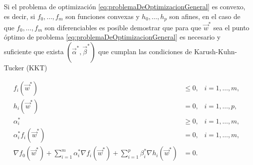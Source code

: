 \documentclass[letterpaper,12pt]{book}
\begin{document}
Si el problema de optimización \ref{eq:problemaDeOptimizacionGeneral} es convexo, es decir, si $f_0,\dots, f_m$ son funciones convexas y $h_0,\dots,h_p$ son afines, en el caso de que $f_0,\dots, f_m$ son diferenciables es posible demostrar que para que $\vec{w}^*$ sea el punto óptimo de problema \ref{eq:problemaDeOptimizacionGeneral} es necesario y suficiente que exista $(\vec{\alpha}^*,\vec{\beta}^*)$ que cumplan las condiciones de Karush-Kuhn-Tucker (KKT)

\begin{align}
    f_i(\vec{w}^*) &\leq 0, & i=1,\dots,m, \\
    h_i(\vec{w}^*) &= 0, & i=1,\dots,p, \\
    \alpha_i^* &\geq 0, & i=1,\dots,m, \\
    \alpha_i^*f_i(\vec{w}^*) & = 0, & i=1,\dots,m, \label{eq:condicionComplementariedad}\\
    \nabla f_0(\vec{w}^*) + \sum_{i=1}^{m}\alpha_i^*\nabla f_i(\vec{w}^*) + \sum_{i=1}^{p}\beta_i^*\nabla h_i(\vec{w}^*) & = 0. &
\end{align}
\end{document}
